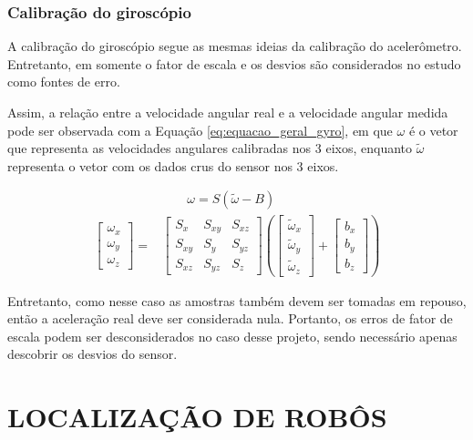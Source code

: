 \documentclass[acronym, symbols, table]{fei}
\begin{document}
		\subsubsection{Calibração do giroscópio}
		
		A calibração do giroscópio segue as mesmas ideias da calibração do acelerômetro. Entretanto, em \textcite{hassan2020field} somente o fator de escala e os desvios são considerados no estudo como fontes de erro.
		
		Assim, a relação entre a velocidade angular real e a velocidade angular medida pode ser observada com a Equação \ref{eq:equacao_geral_gyro}, em que $\omega$ é o vetor que representa as velocidades angulares calibradas nos 3 eixos, enquanto $\tilde{\omega}$ representa o vetor com os dados crus do sensor nos 3 eixos.
		
		\begin{equation}\label{eq:equacao_geral_gyro}
			\begin{split}
				&\quad \quad \omega = S(\tilde{\omega} - B) \\
				\begin{bmatrix}
					\omega_x \\ \omega_y \\ \omega_z
				\end{bmatrix} = 
				&\begin{bmatrix}
					S_x & S_{xy} & S_{xz} \\ S_{xy} & S_y & S_{yz} \\ S_{xz} & S_{yz} & S_z
				\end{bmatrix} \left(
				\begin{bmatrix}
					\tilde{\omega}_x \\ \tilde{\omega}_y \\ \tilde{\omega}_z
				\end{bmatrix} + 
				\begin{bmatrix}
					b_x \\ b_y \\ b_z
				\end{bmatrix}\right)
			\end{split}
		\end{equation}
		
		Entretanto, como nesse caso as amostras também devem ser tomadas em repouso, então a aceleração real deve ser considerada nula. Portanto, os erros de fator de escala podem ser desconsiderados no caso desse projeto, sendo necessário apenas descobrir os desvios do sensor.
				
	\section{LOCALIZAÇÃO DE ROBÔS}
	
\end{document}
